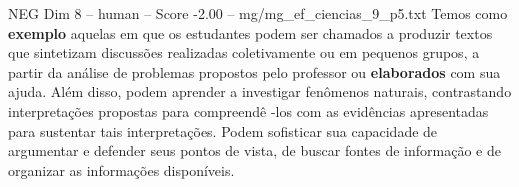 \begin{textsample}{NEG Dim 8 – human – Score -2.00 – mg/mg\_ef\_ciencias\_9\_p5.txt}  \label{ex:f8_neg_010}
Temos como \textbf{exemplo} aquelas em que os estudantes podem ser chamados a produzir textos que sintetizam discussões realizadas coletivamente ou em pequenos grupos, a partir da análise de problemas propostos pelo professor ou \textbf{elaborados} com sua ajuda.
Além disso, podem aprender a investigar fenômenos naturais, contrastando interpretações propostas para compreendê -los com as evidências apresentadas para sustentar tais interpretações.
Podem sofisticar sua capacidade de argumentar e defender seus pontos de vista, de buscar fontes de informação e de organizar as informações disponíveis.

\end{textsample}
